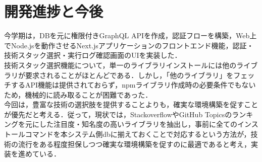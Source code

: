 \documentclass[main]{subfiles}
\begin{document}
\section{開発進捗と今後}
 今学期は，DBを元に権限付きGraphQL APIを作成，認証フローを構築，Web上でNode.jsを動作させるNext.jsアプリケーションのフロントエンド機能，認証・技術スタック選択・実行ログ確認画面のUIを実装した．\\
 技術スタック選択機能について，単一のライブラリインストールには他のライブラリが要求されることがほとんどである．しかし，「他のライブラリ」をフェッチするAPI機能は提供されておらず，npmライブラリ作成時の必要条件でもないため，機械的に読み取ることが困難であった．\\
 今回は，豊富な技術の選択肢を提供することよりも，確実な環境構築を促すことが優先だと考える．従って，現状では，StackoverflowやGitHub Topicsのランキングを元にした注目度・知名度の高いライブラリを抽出し，事前に全てのインストールコマンドを本システム側dbに揃えておくことで対応するという方法が，技術の流行をある程度担保しつつ確実な環境構築を促すのに最適であると考え，実装を進めている．
\end{document}
